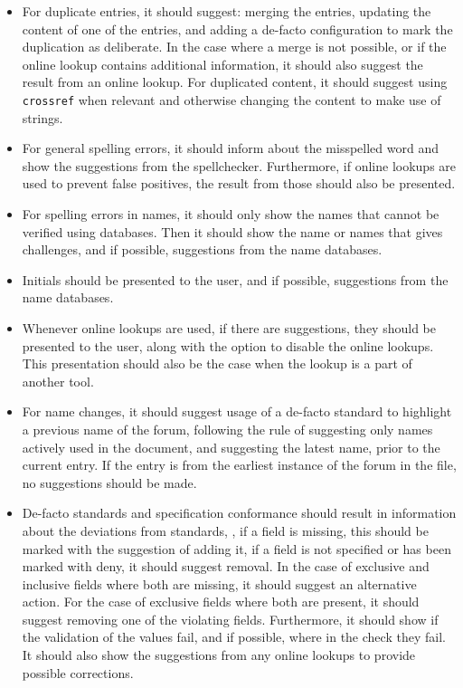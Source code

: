 \begin{itemize}
\item For duplicate entries, it should suggest: merging the entries,
  updating the content of one of the entries, and adding a de-facto
  configuration to mark the duplication as deliberate.  In the case
  where a merge is not possible, or if the online lookup contains
  additional information, it should also suggest the result from an
  online lookup.  For duplicated content, it should suggest using
  \texttt{crossref} when relevant and otherwise changing the content
  to make use of strings.

\item For general spelling errors, it should inform about the
  misspelled word and show the suggestions from the spellchecker.
  Furthermore, if online lookups are used to prevent false positives,
  the result from those should also be presented.

\item For spelling errors in names, it should only show the names that
  cannot be verified using databases.  Then it should show the name or
  names that gives challenges, and if possible, suggestions from the
  name databases.

\item Initials should be presented to the user, and if possible,
  suggestions from the name databases.

\item Whenever online lookups are used, if there are suggestions, they
  should be presented to the user, along with the option to disable
  the online lookups.  This presentation should also be the case when
  the lookup is a part of another tool.

\item For name changes, it should suggest usage of a de-facto standard
  to highlight a previous name of the forum, following the rule of
  suggesting only names actively used in the document, and suggesting
  the latest name, prior to the current entry.  If the entry is from
  the earliest instance of the forum in the file, no suggestions
  should be made.

\item De-facto standards and specification conformance should result
  in information about the deviations from standards, \ie, if a field
  is missing, this should be marked with the suggestion of adding it,
  if a field is not specified or has been marked with deny, it should
  suggest removal.  In the case of exclusive and inclusive fields
  where both are missing, it should suggest an alternative action.
  For the case of exclusive fields where both are present, it should
  suggest removing one of the violating fields.  Furthermore, it
  should show if the validation of the values fail, and if possible,
  where in the check they fail.  It should also show the suggestions
  from any online lookups to provide possible corrections.


\end{itemize}
